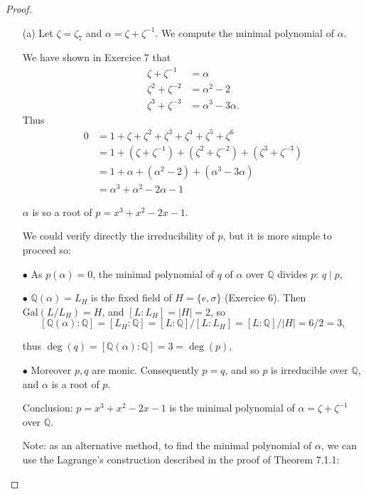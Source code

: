 \documentclass[11pt,a4paper]{article}
\newcommand{\Q}{\mathbb{Q}}
\newcommand{\Gal}{\mathrm{Gal}}
\begin{document}
\begin{proof}
\begin{enumerate}
\item[(a)]
Let $\zeta = \zeta_7$ and $\alpha = \zeta +\zeta^{-1}$.
We compute the minimal polynomial of $\alpha$.

We have shown in Exercice 7 that
\begin{align*}
  \zeta + \zeta^{-1} &= \alpha\\ 
 \zeta^2+\zeta^{-2} &= \alpha^2-2\\
 \zeta^3 + \zeta^{-3}  &= \alpha^3-3\alpha.
 \end{align*}
Thus
 \begin{align*}
 0 &=1+\zeta + \zeta^2+\zeta^3+\zeta^4+\zeta^5+\zeta^6\\
 &=1 + (\zeta+\zeta^{-1}) + (\zeta^2+\zeta^{-2})+ (\zeta^3 + \zeta^{-3})\\
 &=1+\alpha+(\alpha^2-2)+(\alpha^3-3\alpha)\\
 &=\alpha^3+\alpha^2-2\alpha-1
 \end{align*}
 
 $\alpha$ is so a root of $p = x^3+x^2-2x-1$.
 
 We could verify directly the irreducibility of $p$, but it is more simple to proceed so:
 
$\bullet$ As $p(\alpha)=0$, the minimal polynomial of $q$ of $\alpha$ over $\mathbb{Q}$ divides $p$: $q \mid p$,

$\bullet$  $\Q(\alpha) =L_H$ is the fixed field of $H = \{e,\sigma\}$ (Exercice 6). Then $\Gal(L/L_H) = H$, and $[L:L_H] = \vert H \vert = 2$, so $$[\Q(\alpha) : \Q] = [L_H:\Q] = [L:\Q]/[L : L_H] = [L:\Q]/ \vert H \vert = 6/2 =3,$$ 

thus $\deg(q) = [\Q(\alpha) : \mathbb{Q}] = 3 = \deg(p)$,

$\bullet$ Moreover  $p,q$ are monic. 
Consequently $p=q$, and so $p$ is irreducible over $\Q$, and $\alpha$ is a root of $p$.

Conclusion: $p=x^3+x^2-2x-1$ is the minimal polynomial of $\alpha = \zeta+\zeta^{-1}$ over $\Q$.

Note: as an alternative method, to find the minimal polynomial of $\alpha$, we can use the Lagrange's construction described in the proof of Theorem 7.1.1:


\end{enumerate}
\end{proof}
\end{document}
